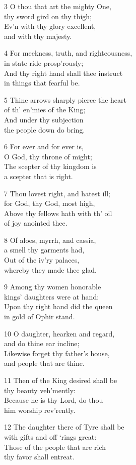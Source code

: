3 O thou that art the mighty One,\\
thy sword gird on thy thigh;\\
Ev’n with thy glory excellent,\\
and with thy majesty.

4 For meekness, truth, and righteousness,\\
in state ride prosp’rously;\\
And thy right hand shall thee instruct\\
in things that fearful be.

5 Thine arrows sharply pierce the heart\\
of th’ en’mies of the King;\\
And under thy subjection\\
the people down do bring.

6 For ever and for ever is,\\
O God, thy throne of might;\\
The scepter of thy kingdom is\\
a scepter that is right.

7 Thou lovest right, and hatest ill;\\
for God, thy God, most high,\\
Above thy fellows hath with th’ oil\\
of joy anointed thee.

8 Of aloes, myrrh, and cassia,\\
a smell thy garments had,\\
Out of the iv’ry palaces,\\
whereby they made thee glad.

9 Among thy women honorable\\
kings’ daughters were at hand:\\
Upon thy right hand did the queen\\
in gold of Ophir stand.

10 O daughter, hearken and regard,\\
and do thine ear incline;\\
Likewise forget thy father’s house,\\
and people that are thine.

11 Then of the King desired shall be\\
thy beauty veh’mently:\\
Because he is thy Lord, do thou\\
him worship rev’rently.

12 The daughter there of Tyre shall be\\
with gifts and off ‘rings great:\\
Those of the people that are rich\\
thy favor shall entreat.

